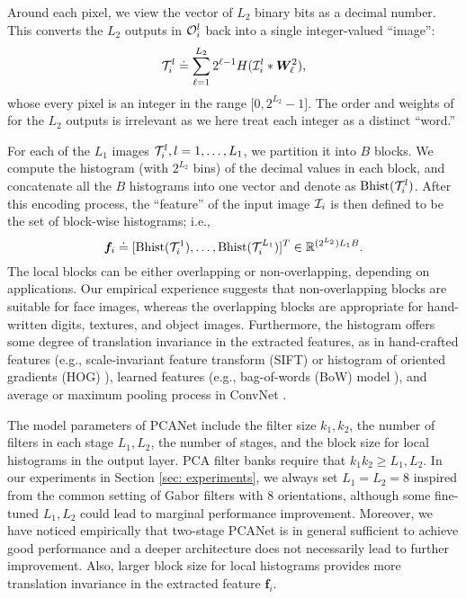 \documentclass[10pt,journal,compsoc]{IEEEtran}
\begin{document}
Around each pixel, we view the vector of $L_2$ binary bits as a decimal number. This converts the $L_2$ outputs in ${\cal O}_i^{l}$ back into a single integer-valued ``image'':
\begin{equation}
{\cal T}_i^{l} \doteq \sum_{\ell=1}^{L_2} 2^{\ell-1} H({\cal I}_i^l*\bm{ W}^2_{\ell}),
\end{equation}
whose every pixel is an integer in the range $\big[0,2^{L_2}-1\big]$. The order and weights of for the $L_2$ outputs is irrelevant as we here treat each integer as a distinct ``word.''

For each of the $L_1$ images ${\cal T}_i^l, l = 1, \ldots, L_1$, we partition it into $B$ blocks. We compute the histogram (with $2^{L_2}$ bins) of the decimal values in each block, and concatenate all the $B$ histograms into one vector and denote as ${\rm Bhist}({\cal T}_i^{l})$. After this encoding process, the ``feature'' of the input image ${\cal I}_i$ is then defined to be the set of block-wise histograms; i.e.,
\begin{equation}
\bm{f}_i \doteq [{\rm Bhist}({\cal T}_i^{1}),\ldots,{\rm Bhist}({\cal T}_i^{L_1})]^T \in \mathbb{R}^{(2^{L_2})L_1B}.
\end{equation}
The local blocks can be either overlapping or non-overlapping, depending on applications. Our empirical experience suggests that non-overlapping blocks are suitable for face images, whereas the overlapping blocks are appropriate for hand-written digits, textures, and object images. Furthermore, the histogram offers some degree of translation invariance in the extracted features, as in hand-crafted features (e.g., scale-invariant feature transform (SIFT) \cite{Lowe2004} or histogram of oriented gradients (HOG) \cite{Dalal2005}), learned features (e.g., bag-of-words (BoW) model \cite{Fei2005}), and average or maximum pooling process in ConvNet \cite{LeCun1998, Jarrett2009, Kayukcuoglu2010, Goodfellow2013, Krizhevsky2012}.

The model parameters of PCANet include the filter size $k_1,k_2$, the number of filters in each stage $L_1, L_2$, the number of stages, and the block size for local histograms in the output layer. PCA filter banks require that $k_1k_2 \geq L_1, L_2$. In our experiments in Section \ref{sec: experiments}, we always set $L_1 = L_2 = 8$ inspired from the common setting of Gabor filters \cite{Liu2002} with 8 orientations, although some fine-tuned $L_1, L_2$ could lead to marginal performance improvement. Moreover, we have noticed empirically that two-stage PCANet is in general sufficient to achieve good performance and a deeper architecture does not necessarily lead to further improvement. Also, larger block size for local histograms provides more translation invariance in the extracted feature $\bm{f}_i$.
\end{document}
